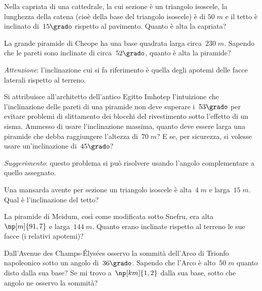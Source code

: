 \begin{multicols}{2}
\begin{esercizio}[\Ast]
\label{ese:G.57}
Nella capriata di una cattedrale, la cui sezione è un triangolo isoscele, la lunghezza della catena (cioè della base del triangolo isoscele) è di
$50\;\unit{m}$ e il tetto è inclinato di~$15\grado$ rispetto al pavimento. Quanto è alta la capriata?
\end{esercizio}

\begin{esercizio}[\Ast]
\label{ese:G.58}
La grande piramide di Cheope ha una base quadrata larga circa~$230\;\unit{m}$. Sapendo che le pareti sono inclinate di circa~$52\grado$,
quanto è alta la piramide?

\emph{Attenzione}: l'inclinazione cui si fa riferimento è quella degli apotemi delle facce laterali rispetto al terreno.
\end{esercizio}

\begin{esercizio}[\Ast]
\label{ese:G.59}
Si attribuisce all'architetto dell'antico Egitto Imhotep l'intuizione che l'inclinazione delle pareti di una piramide non deve superare
i~$53\grado$ per evitare problemi di slittamento dei blocchi del rivestimento sotto l'effetto di un sisma. Ammesso di usare
l'inclinazione massima, quanto deve essere larga una piramide che debba raggiungere l'altezza di~$70\;\unit{m}$?
E se, per sicurezza, si volesse usare un'inclinazione di~$45\grado$?

\emph{Suggerimento}: questo problema si può risolvere usando l'angolo complementare a quello assegnato.
\end{esercizio}

\begin{esercizio}[\Ast]
\label{ese:G.60}
Una mansarda avente per sezione un triangolo isoscele è alta~$4\;\unit{m}$ e larga~$15\;\unit{m}$. Qual è l'inclinazione del tetto?
\end{esercizio}

\begin{esercizio}[\Ast]
\label{ese:G.61}
La piramide di Meidum, così come modificata sotto Snefru, era alta~$\np[m]{91,7}$ e larga~$144\;\unit{m}$.
Quanto erano inclinate rispetto al terreno le sue facce (i relativi apotemi)?
\end{esercizio}

\begin{esercizio}[\Ast]
\label{ese:G.62}
Dall'Avenue des Champs-Élysées osservo la sommità dell'Arco di Trionfo napoleonico sotto un angolo di~$36\grado$.
Sapendo che l'Arco è alto~$50\;\unit{m}$ quanto disto dalla sua base? Se mi trovo a~$\np[km]{1,2}$ dalla sua base,
sotto che angolo ne osservo la sommità?
\end{esercizio}


\end{multicols}
